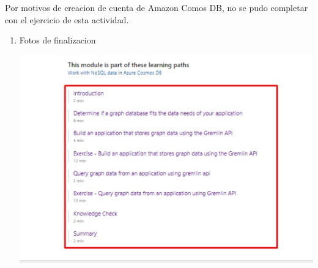 \documentclass[12pt,letterpaper]{article}
\begin{document}
\item	Por motivos de creacion de cuenta de Amazon Comos DB, no se pudo completar con el ejercicio de esta actividad.
\begin{enumerate}
	
	
	\item Fotos de finalizacion
	\begin{center}
		\includegraphics[width=14cm]{./img/f1.jpg} 
	\end{center}
	

\end{enumerate}
\end{document}
